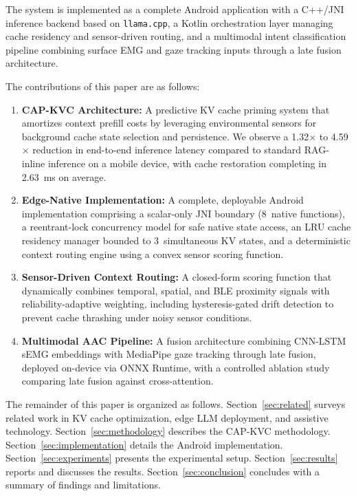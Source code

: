 The system is implemented as a complete Android application with a C++/JNI inference backend based on \texttt{llama.cpp}, a Kotlin orchestration layer managing cache residency and sensor-driven routing, and a multimodal intent classification pipeline combining surface EMG and gaze tracking inputs through a late fusion architecture.

The contributions of this paper are as follows:

\begin{enumerate}
    \item \textbf{CAP-KVC Architecture:} A predictive KV cache priming system that amortizes context prefill costs by leveraging environmental sensors for background cache state selection and persistence. We observe a 1.32$\times$ to 4.59$\times$ reduction in end-to-end inference latency compared to standard RAG-inline inference on a mobile device, with cache restoration completing in 2.63~ms on average.

    \item \textbf{Edge-Native Implementation:} A complete, deployable Android implementation comprising a scalar-only JNI boundary (8~native functions), a reentrant-lock concurrency model for safe native state access, an LRU cache residency manager bounded to 3~simultaneous KV states, and a deterministic context routing engine using a convex sensor scoring function.

    \item \textbf{Sensor-Driven Context Routing:} A closed-form scoring function that dynamically combines temporal, spatial, and BLE proximity signals with reliability-adaptive weighting, including hysteresis-gated drift detection to prevent cache thrashing under noisy sensor conditions.

    \item \textbf{Multimodal AAC Pipeline:} A fusion architecture combining CNN-LSTM sEMG embeddings with MediaPipe gaze tracking through late fusion, deployed on-device via ONNX Runtime, with a controlled ablation study comparing late fusion against cross-attention.
\end{enumerate}

The remainder of this paper is organized as follows. Section~\ref{sec:related} surveys related work in KV cache optimization, edge LLM deployment, and assistive technology. Section~\ref{sec:methodology} describes the CAP-KVC methodology. Section~\ref{sec:implementation} details the Android implementation. Section~\ref{sec:experiments} presents the experimental setup. Section~\ref{sec:results} reports and discusses the results. Section~\ref{sec:conclusion} concludes with a summary of findings and limitations.

